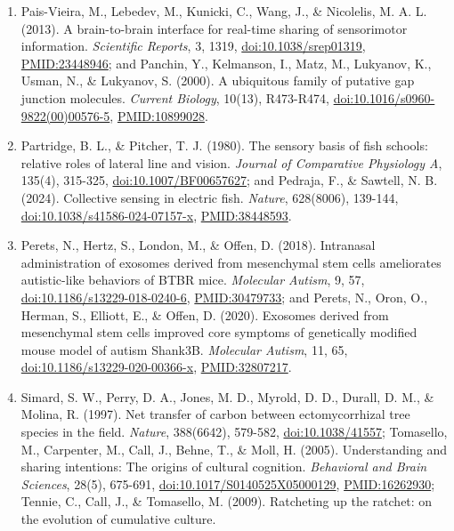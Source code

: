 \documentclass[10pt,letterpaper]{article}
\begin{document}
\begin{enumerate}
\item
  Pais-Vieira, M., Lebedev, M., Kunicki, C., Wang, J., \& Nicolelis, M.
  A. L. (2013). A brain-to-brain interface for real-time sharing of
  sensorimotor information. \emph{Scientific Reports}, 3, 1319,
  \href{https://doi.org/10.1038/srep01319}{doi:10.1038/srep01319},
  \url{PMID:23448946}; and Panchin, Y., Kelmanson, I., Matz, M.,
  Lukyanov, K., Usman, N., \& Lukyanov, S. (2000). A ubiquitous family
  of putative gap junction molecules. \emph{Current Biology}, 10(13),
  R473-R474,
  \href{https://doi.org/10.1016/s0960-9822(00)00576-5}{doi:10.1016/s0960-9822(00)00576-5},
  \url{PMID:10899028}.
\item
  Partridge, B. L., \& Pitcher, T. J. (1980). The sensory basis of fish
  schools: relative roles of lateral line and vision. \emph{Journal of
  Comparative Physiology A}, 135(4), 315-325,
  \href{https://doi.org/10.1007/BF00657627}{doi:10.1007/BF00657627}; and
  Pedraja, F., \& Sawtell, N. B. (2024). Collective sensing in electric
  fish. \emph{Nature}, 628(8006), 139-144,
  \href{https://doi.org/10.1038/s41586-024-07157-x}{doi:10.1038/s41586-024-07157-x},
  \url{PMID:38448593}.
\item
  Perets, N., Hertz, S., London, M., \& Offen, D. (2018). Intranasal
  administration of exosomes derived from mesenchymal stem cells
  ameliorates autistic-like behaviors of BTBR mice. \emph{Molecular
  Autism}, 9, 57,
  \href{https://doi.org/10.1186/s13229-018-0240-6}{doi:10.1186/s13229-018-0240-6},
  \url{PMID:30479733}; and Perets, N., Oron, O., Herman, S., Elliott,
  E., \& Offen, D. (2020). Exosomes derived from mesenchymal stem cells
  improved core symptoms of genetically modified mouse model of autism
  Shank3B. \emph{Molecular Autism}, 11, 65,
  \href{https://doi.org/10.1186/s13229-020-00366-x}{doi:10.1186/s13229-020-00366-x},
  \url{PMID:32807217}.
\item
  Simard, S. W., Perry, D. A., Jones, M. D., Myrold, D. D., Durall, D.
  M., \& Molina, R. (1997). Net transfer of carbon between
  ectomycorrhizal tree species in the field. \emph{Nature}, 388(6642),
  579-582, \href{https://doi.org/10.1038/41557}{doi:10.1038/41557};
  Tomasello, M., Carpenter, M., Call, J., Behne, T., \& Moll, H. (2005).
  Understanding and sharing intentions: The origins of cultural
  cognition. \emph{Behavioral and Brain Sciences}, 28(5), 675-691,
  \href{https://doi.org/10.1017/S0140525X05000129}{doi:10.1017/S0140525X05000129},
  \url{PMID:16262930}; Tennie, C., Call, J., \& Tomasello, M. (2009).
  Ratcheting up the ratchet: on the evolution of cumulative culture.

\end{enumerate}
\end{document}
